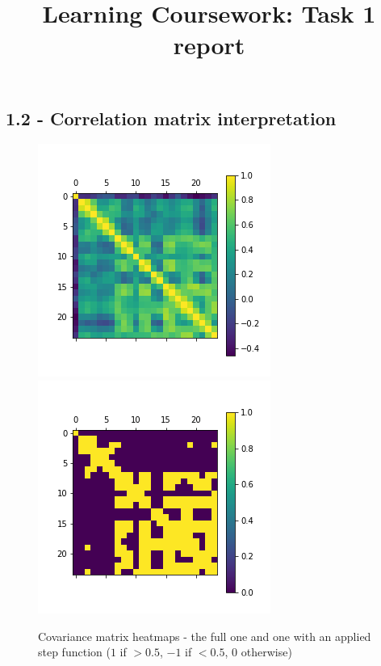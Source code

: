 \documentclass[12pt]{article}
\begin{document}
 
 
\title{Learning Coursework: Task 1 report}


\maketitle
\newpage
\subsection*{1.2 - Correlation matrix interpretation}

\begin{figure}[!htb]
\centering
\includegraphics[scale=0.6]{task1_2_covm.png}
\includegraphics[scale=0.6]{task1_2_covm_stepped.png}
\caption{Covariance matrix heatmaps - the full one and one with an applied step function ($1$ if $> 0.5$, $-1$ if $< 0.5$, $0$ otherwise)}
\label{task1_2_covm}
\end{figure}
\end{document}
